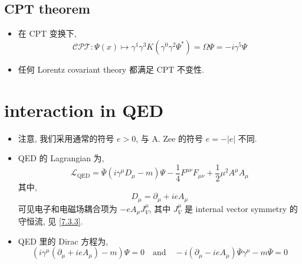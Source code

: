 \subsection{CPT theorem}
\begin{itemize}
	\item 在 CPT 变换下,
	\begin{equation}
		\mathcal{CPT} : \Psi(x) \mapsto \gamma^1 \gamma^3 K (\gamma^0 \gamma^2 \Psi^*) = \Omega \Psi = - i \gamma^5 \Psi
	\end{equation}
	
	\item 任何 Lorentz covariant theory 都满足 CPT 不变性.
\end{itemize}

\section{interaction in QED}
\begin{itemize}
	\item 注意, 我们采用通常的符号 $e > 0$, 与 A. Zee 的符号 $e = - |e|$ 不同.
	
	\item QED 的 Lagrangian 为,
	\begin{equation}
		\mathcal{L}_\text{QED} = \bar{\Psi} (i \gamma^\mu D_\mu - m) \Psi - \frac{1}{4} F^{\mu \nu} F_{\mu \nu} + \frac{1}{2} \mu^2 A^\mu A_\mu
	\end{equation}
	其中,
	\begin{equation}
		D_\mu = \partial_\mu + i e A_\mu
	\end{equation}
	可见电子和电磁场耦合项为 $- e A_\mu J_V^\mu$, 其中 $J_V^\mu$ 是 internal vector symmetry 的守恒流, 见 \eqref{7.3.3}.
	
	\item QED 里的 Dirac 方程为,
	\begin{equation}
		(i \gamma^\mu (\partial_\mu + i e A_\mu) - m) \Psi = 0 \quad \text{and} \quad - i (\partial_\mu - i e A_\mu) \bar{\Psi} \gamma^\mu - m \bar{\Psi} = 0
	\end{equation}
\end{itemize}

